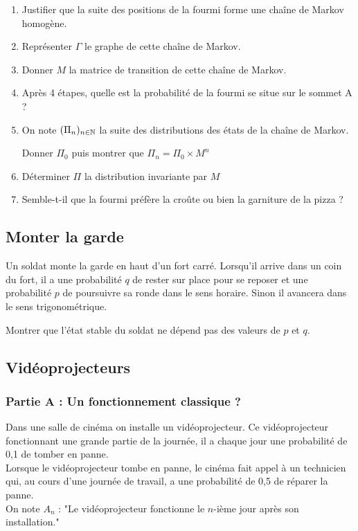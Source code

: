 \documentclass[oneside,12pt]{book}          %
\begin{document}
\begin{enumerate}
    \item Justifier que la suite des positions de la fourmi forme une chaîne de Markov homogène.
    \item Représenter $\Gamma$ le graphe de cette chaîne de Markov.
    \item Donner $M$ la matrice de transition de cette chaîne de Markov.
    \item Après 4 étapes, quelle est la probabilité de la fourmi se situe sur le sommet A ?
    \item On note $(\Pi_n)_{{n\in\mathbb N}}$ la suite des distributions des états de la chaîne de Markov.

    Donner $\Pi_0$ puis montrer que $\Pi_n=\Pi_0\times M^n$
    \item Déterminer $\Pi$ la distribution invariante par $M$
    \item Semble-t-il que la fourmi préfère la croûte ou bien la garniture de la pizza ?
\end{enumerate}



\subsection{Monter la garde}
Un soldat monte la garde en haut d'un fort carré. Lorsqu'il arrive dans un coin du fort, il a une probabilité $q$ de rester sur place pour se reposer et une probabilité $p$ de poursuivre sa ronde dans le sens horaire. Sinon il avancera dans le sens trigonométrique.

Montrer que l'état stable du soldat ne dépend pas des valeurs de $p$ et $q$.



\subsection{Vidéoprojecteurs}

\subsubsection*{Partie A : Un fonctionnement classique ?}

Dans une salle de cinéma on installe un vidéoprojecteur. Ce vidéoprojecteur fonctionnant une grande partie de la journée, il a chaque jour une probabilité de 0,1 de tomber en panne.\\[5pt]
Lorsque le vidéoprojecteur tombe en panne, le cinéma fait appel à un technicien qui, au cours d'une journée de travail, a une probabilité de 0,5 de réparer la panne.\\[5pt]
On note $A_n$ : "Le vidéoprojecteur fonctionne le $n$-ième jour après son installation."
\end{document}
